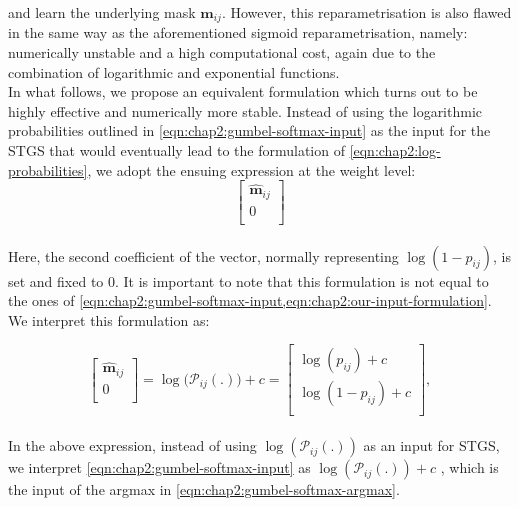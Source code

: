 \noindent and learn the underlying mask $\bm{\hat{m}}_{ij}$. However, this
reparametrisation is also flawed in the same way as the aforementioned sigmoid
reparametrisation, namely: numerically unstable and a high computational cost,
again due to the combination of logarithmic and exponential functions.\\

In what follows, we propose an equivalent formulation which turns out to be
highly effective and numerically more stable.  Instead of using the logarithmic
probabilities outlined in \cref{eqn:chap2:gumbel-softmax-input} as the input for
the \ac{STGS} that would eventually lead to the formulation of
\cref{eqn:chap2:log-probabilities}, we adopt the ensuing expression at the
weight level:\\

\begin{equation}
  \label{eqn:chap2:our-input-formulation}
  \begin{bmatrix}
    \bm{\hat{m}}_{ij} \\
    0                 \\
  \end{bmatrix}
\end{equation}\\

Here, the second coefficient of the vector, normally representing
$\log(1-p_{ij})$, is set and fixed to 0. It is important to note that this
formulation is not equal to the ones of
\cref{eqn:chap2:gumbel-softmax-input,eqn:chap2:our-input-formulation}. We
interpret this formulation as:

\begin{equation}
  \label{eqn:chap2:our-formulation}
  \begin{bmatrix}
    \bm{\hat{m}}_{ij} \\
    0                 \\
  \end{bmatrix}
  = \log\big(\mathcal{P}_{ij}(.)\big) + c =
  \begin{bmatrix}
    \log(p_{ij}) + c   \\
    \log(1-p_{ij}) + c \\
  \end{bmatrix},
\end{equation}\\

\noindent In the above expression, instead of using $\log(\mathcal{P}_{ij}(.))$
as an input for \ac{STGS}, we interpret \cref{eqn:chap2:gumbel-softmax-input} as
$\log(\mathcal{P}_{ij}(.)) + c$ , which is the input of the argmax in
\cref{eqn:chap2:gumbel-softmax-argmax}.\\

